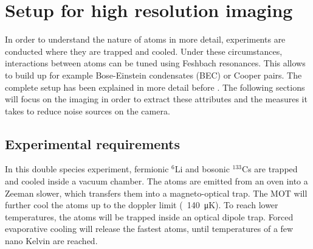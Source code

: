 \chapter{Setup for high resolution imaging}

In order to understand the nature of atoms in more detail, experiments are conducted where they are trapped and cooled. Under these circumstances, interactions between atoms can be tuned using Feshbach resonances. This allows to build up for example Bose-Einstein condensates (BEC) or Cooper pairs. The complete setup has been explained in more detail before \cite{Repp2013}. The following sections will focus on the imaging in order to extract these attributes and the measures it takes to reduce noise sources on the camera.

\section{Experimental requirements}
In this double species experiment, fermionic $^6$Li and bosonic $^{133}$Cs are trapped and cooled inside a vacuum chamber. The atoms are emitted from an oven into a Zeeman slower, which transfers them into a magneto-optical trap. The MOT will further cool the atoms up to the doppler limit (~\SI{140}{\micro\kelvin}). To reach lower temperatures, the atoms will be trapped inside an optical dipole trap. Forced evaporative cooling will release the fastest atoms, until temperatures of a few nano Kelvin are reached.


